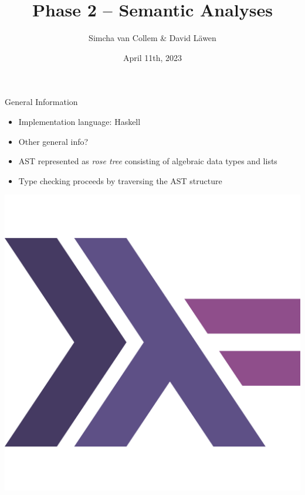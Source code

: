 \documentclass[dvipsnames,aspectratio=169]{beamer}
\title[Phase 2 -- Semantic Analyses]%
{Phase 2 -- Semantic Analyses}
\subtitle
{}
\author%
{Simcha van Collem \& David Läwen}
\institute[]%
{Compiler Construction}
\date[April 11th, 2023] %
{April 11th, 2023}
\begin{document}
\begin{frame}
  \titlepage
\end{frame}

\begin{frame}{General Information}

  \begin{minipage}{.6\textwidth}

    \begin{itemize}
      \item Implementation language: Haskell
      \item Other general info?
      \item AST represented as \emph{rose tree} consisting of algebraic data
            types and lists
      \item Type checking proceeds by traversing the AST structure
    \end{itemize}

  \end{minipage}\hfill
  \begin{minipage}{.3\textwidth}
    \includegraphics[scale=.17]{assets/haskell-icon.pdf}
  \end{minipage}

\end{frame}
\end{document}
